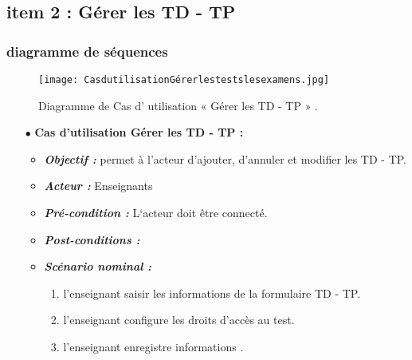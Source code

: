\clearpage

\subsection{item 2 : Gérer les  TD  -  TP}

\subsubsection{diagramme de séquences }
\begin{figure}[ht]
	\centering
	\texttt{[image: CasdutilisationGérerlestestslesexamens.jpg]}
	\caption{Diagramme de Cas d' utilisation « Gérer les  TD  -  TP » .}
	\label{fig:Diagramme de Cas d' utilisation  Gérer les  TD  -  TP }
\end{figure}
\FloatBarrier
\begin{itemize}
	\item[$\bullet$] \textbf{Cas d’utilisation  Gérer les  TD  -  TP :} 
	\medskip
	\begin{itemize}
		\item \textit{\textbf{Objectif :}} permet à l’acteur d’ajouter, d’annuler et modifier les  TD  -  TP.
		\item \textit{\textbf{Acteur :}} Enseignants
		
		\item \textit{\textbf{Pré-condition  :}} L‘acteur doit être connecté.
		\item \textit{\textbf{Post-conditions   :}}
		\item \textit{\textbf{Scénario nominal :}}
		\begin{enumerate} 
			\item  l'enseignant saisir les informations de la formulaire TD  -  TP. 
			\item     l'enseignant configure les droits d’accès au test. 
			\item   l'enseignant enregistre informations .


		\end{enumerate}
	\end{itemize}
\end{itemize}	
\bigskip
